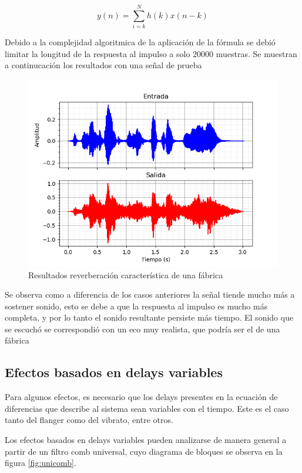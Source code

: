 \documentclass[assd_tp2_main.tex]{subfiles}
\begin{document}
\begin{equation}
y(n)=\sum_{i=k}^{N}h(k)x(n-k)
\end{equation}

Debido a la complejidad algoritmica de la aplicación de la fórmula se debió limitar la longitud de la respuesta al impulso a solo 20000 muestras. Se muestran a continucación los resultados con una señal de prueba

\begin{figure}[H]	
	\centering
	\includegraphics[scale=1]{graficos/EJ8/eco_convolucion.png}
	\caption{Resultados reverberación característica de una fábrica}
	\label{fig:bloqueElemental}
\end{figure}

Se observa como a diferencia de los casos anteriores la señal tiende mucho más a sostener sonido, esto se debe a que la respuesta al impulso es mucho más completa, y por lo tanto el sonido resultante persiste más tiempo.
El sonido que se escuchó se correspondió con un eco muy realista, que podría ser el de una fábrica


\subsection{Efectos basados en delays variables} 

Para algunos efectos, es necesario que los delays presentes en la ecuaci\'on de diferencias que describe al sistema sean variables con el tiempo. Este es el caso tanto del flanger como del vibrato, entre otros.

Los efectos basados en delays variables pueden analizarse de manera general a partir de un filtro comb universal, cuyo diagrama de bloques se observa en la figura \ref{fig:unicomb}.
\end{document}
